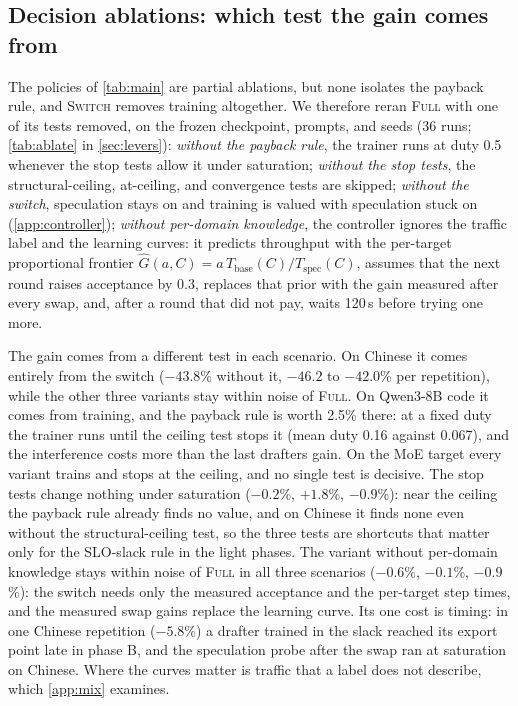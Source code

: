 \documentclass{article}
\newcommand{\Ghat}{\widehat{G}}
\newcommand{\pol}[1]{\textsc{#1}}
\begin{document}
\FloatBarrier
\subsection{Decision ablations: which test the gain comes from}\label{app:ablation}

The policies of \cref{tab:main} are partial ablations, but none isolates the payback rule, and \pol{Switch} removes training altogether. We therefore reran \pol{Full} with one of its tests removed, on the frozen checkpoint, prompts, and seeds (36 runs; \cref{tab:ablate} in \cref{sec:levers}): \emph{without the payback rule}, the trainer runs at duty 0.5 whenever the stop tests allow it under saturation; \emph{without the stop tests}, the structural-ceiling, at-ceiling, and convergence tests are skipped; \emph{without the switch}, speculation stays on and training is valued with speculation stuck on (\cref{app:controller}); \emph{without per-domain knowledge}, the controller ignores the traffic label and the learning curves: it predicts throughput with the per-target proportional frontier $\Ghat(a,C)=a\,T_{\mathrm{base}}(C)/T_{\mathrm{spec}}(C)$, assumes that the next round raises acceptance by 0.3, replaces that prior with the gain measured after every swap, and, after a round that did not pay, waits 120\,s before trying one more.

The gain comes from a different test in each scenario. On Chinese it comes entirely from the switch ($-43.8$\% without it, $-46.2$ to $-42.0$\% per repetition), while the other three variants stay within noise of \pol{Full}. On Qwen3-8B code it comes from training, and the payback rule is worth 2.5\% there: at a fixed duty the trainer runs until the ceiling test stops it (mean duty 0.16 against 0.067), and the interference costs more than the last drafters gain. On the MoE target every variant trains and stops at the ceiling, and no single test is decisive. The stop tests change nothing under saturation ($-0.2$\%, $+1.8$\%, $-0.9$\%): near the ceiling the payback rule already finds no value, and on Chinese it finds none even without the structural-ceiling test, so the three tests are shortcuts that matter only for the SLO-slack rule in the light phases. The variant without per-domain knowledge stays within noise of \pol{Full} in all three scenarios ($-0.6$\%, $-0.1$\%, $-0.9$\%): the switch needs only the measured acceptance and the per-target step times, and the measured swap gains replace the learning curve. Its one cost is timing: in one Chinese repetition ($-5.8$\%) a drafter trained in the slack reached its export point late in phase B, and the speculation probe after the swap ran at saturation on Chinese. Where the curves matter is traffic that a label does not describe, which \cref{app:mix} examines.
\end{document}
